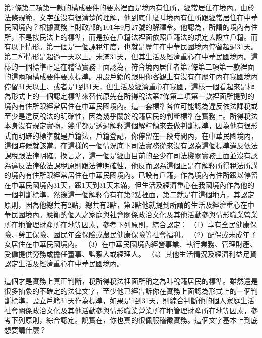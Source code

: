 \documentclass[]{ctexbook}
\begin{document}
第7條第二項第一款的構成要件的要素裡面是境內有住所，經常居住在境內。由於法條規範，文字並沒有很清楚的理解，他到底什麼叫境內有住所跟經常居住在中華民國境內？根據實務上財政部的101年9月27號的解釋令。他認為，所謂的境內有住所，不是按民法上的標準，而是按在戶籍法裡面依照戶籍法的規定去設立戶籍。而有以下情形。第一個是一個課稅年度，也就是歷年在中華民國境內停留超過31天。第二種情形是超過一天以上。未滿31天，但其生活及經濟重心在中華民國境內。這樣的一個標準正是在稽徵實務上面認為，符合境內居住者第7條第二項第一款裡面的這兩項構成要件要素標準。用設戶籍的跟用你客觀上有沒有在歷年內在我國境內停留31天以上、或者是1到31天，但生活及經濟重心在我國，這樣一個看起來是極為形式上的一個認定標準來替代原先在所得稅法第7條第二項第一款裡面所提到的境內有住所跟經常居住在中華民國境內。這一套標準各位可能認為違反依法課稅或至少是違反稅法的明確性，因為幾乎關於稅籍居民的判斷標準在實務上。所得稅法本身沒有規定實物，幾乎都是透過解釋這個解釋領來去做判斷標準，因為他有很形式而明確的標準就是戶籍法，戶籍登記，你停留在一段時間內，在中華民國境內，這個時候就該當。在這樣的一個情況底下司法實務從來沒有認為這個標準違反依法課稅跟法律明確。換言之，這一個是經由目前的至少在司法機關實務上面並沒有認為違反法律依法課稅原則跟法律明確性，他反而認為這個正是在解釋所得稅法所講的境內有住所跟經常居住在中華民國境內。已設有戶籍，作為境內有住所跟以停留在中華民國境內31天，跟1天到31天未滿，但生活及經濟重心在我國境內作為他的一個判斷標準，然後這一個解釋令有在第2點裡面，第二就是在這個地方，其認定原則，因為他總共有2點，總共有2點，第2點他就提到所謂的生活及經濟重心在中華民國境內。應衡酌個人之家庭與社會關係政治文化及其他活動參與情形職業營業所在地管理財產所在地等因素，參考下列原則，綜合認定：
（1）享有全民健康保險、勞工保險、國民年金保險或農民健康保險等社會福利。
（2）配偶或未成年子女居住在中華民國境內。
（3）在中華民國境內經營事業、執行業務、管理財產、受僱提供勞務或擔任董事、監察人或經理人。
（4）其他生活情況及經濟利益足資認定生活及經濟重心在中華民國境內。

這個才是實務上真正判斷，稅所得稅法裡面所稱之為叫稅籍居民的標準。雖然還是很多抽象的不確定的法律文字，至少他已經告訴你在實務上面認為形式上的一個判斷標準，設立戶籍31天作為標準，如果是1到31天，則綜合判斷他的個人家庭生活社會關係政治文化及其他活動參與情形職業營業所在地管理財產所在地等因素，參考下列原則，綜合認定。說實在，你也真的很佩服稽徵實務。這個文字基本上到底想要講什麼？
\end{document}
